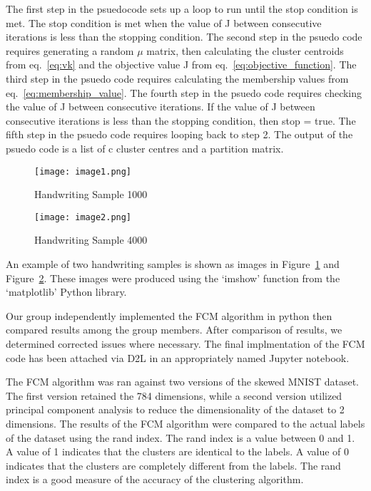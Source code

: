 The first step in the psuedocode sets up a loop to run until the stop condition is met. 
The stop condition is met when the value of J between consecutive iterations is less than the stopping condition. 
The second step in the psuedo code requires generating a random $\mu$ matrix, 
then calculating the cluster centroids from eq.~\ref{eq:vk} and the objective value J from eq.~\ref{eq:objective_function}. 
The third step in the psuedo code requires calculating the membership values from eq.~\ref{eq:membership_value}. 
The fourth step in the psuedo code requires checking the value of J between consecutive iterations. 
If the value of J between consecutive iterations is less than the stopping condition, then stop = true. 
The fifth step in the psuedo code requires looping back to step 2. 
The output of the psuedo code is a list of c cluster centres and a partition matrix. \newline
\begin{figure}[H]
    \centering    
    \texttt{[image: image1.png]}
    \caption{Handwriting Sample 1000}
    \label{fig:image1}    
\end{figure}


\begin{figure}[H]
    \centering
    \texttt{[image: image2.png]}
    \caption{Handwriting Sample 4000}
    \label{fig:image2}    
\end{figure}

An example of two handwriting samples is shown as images in Figure~\ref{fig:image1} and Figure~\ref{fig:image2}. 
These images were produced using the `imshow' function from the `matplotlib' Python library.

Our group independently implemented the FCM algorithm in python then compared results among the group members. After comparison of results, we determined corrected issues where necessary. The final implmentation of the FCM code has been attached via D2L in an appropriately named Jupyter notebook.

The FCM algorithm was ran against two versions of the skewed MNIST dataset.
The first version retained the 784 dimensions, while a second version utilized principal component analysis to reduce the dimensionality of the dataset to 2 dimensions. 
The results of the FCM algorithm were compared to the actual labels of the dataset using the rand index.
The rand index is a value between 0 and 1. 
A value of 1 indicates that the clusters are identical to the labels.
A value of 0 indicates that the clusters are completely different from the labels. 
The rand index is a good measure of the accuracy of the clustering algorithm.





        